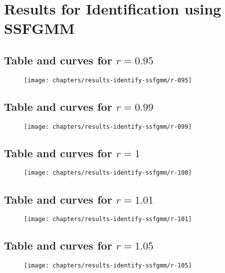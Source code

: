 \chapter{Results for Identification using SSFGMM}
\label{apx:results-identify-ssfgmm}

\section{Table and curves for $r = 0.95$}



\begin{figure}[ht]
    \centering
    \texttt{[image: chapters/results-identify-ssfgmm/r-095]}
    \label{fig:r-095}
\end{figure}

\newpage
\section{Table and curves for $r = 0.99$}



\begin{figure}[ht]
    \centering
    \texttt{[image: chapters/results-identify-ssfgmm/r-099]}
    \label{fig:r-099}
\end{figure}

\newpage
\section{Table and curves for $r = 1$}



\begin{figure}[ht]
    \centering
    \texttt{[image: chapters/results-identify-ssfgmm/r-100]}
    \label{fig:r-100}
\end{figure}

\newpage
\section{Table and curves for $r = 1.01$}



\begin{figure}[ht]
    \centering
    \texttt{[image: chapters/results-identify-ssfgmm/r-101]}
    \label{fig:r-101}
\end{figure}

\newpage
\section{Table and curves for $r = 1.05$}



\begin{figure}[ht]
    \centering
    \texttt{[image: chapters/results-identify-ssfgmm/r-105]}
    \label{fig:r-105}
\end{figure}